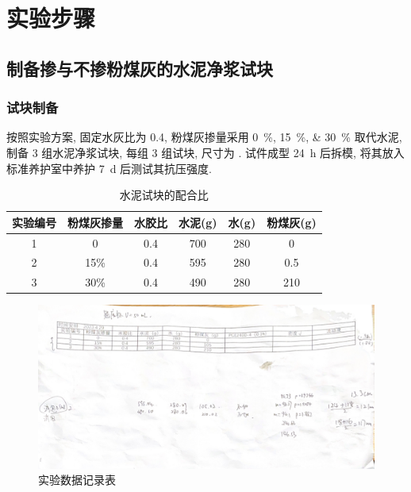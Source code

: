 
\section{实验步骤}

\subsection{制备掺与不掺粉煤灰的水泥净浆试块}

\subsubsection{试块制备}
按照实验方案, 固定水灰比为 \num{0.4}, 粉煤灰掺量采用 \qtylist{0; 15; 30}{\percent} 取代水泥, 制备 3 组水泥净浆试块, 每组 3 组试块, 尺寸为 .
试件成型 \SI{24}{\hour} 后拆模, 将其放入标准养护室中养护 \SI{7}{\day} 后测试其抗压强度.
\begin{table}[!t]
    \centering
    \caption{水泥试块的配合比}
    \begin{tabular}{|c|c|c|c|c|c|}
    \hline
    实验编号 & 粉煤灰掺量 & 水胶比 & 水泥(g) & 水(g) & 粉煤灰(g) \\ \hline
    1    & 0      & 0.4 & 700   & 280  & 0      \\ \hline
    2    & 15\%   & 0.4 & 595   & 280  & 0.5    \\ \hline
    3    & 30\%   & 0.4 & 490   & 280  & 210    \\ \hline
    \end{tabular}
    
\end{table}
\begin{figure}
    \centering
    
    \includegraphics[width = 0.7 \linewidth]{figures/exp1/record table.png}
    \caption{实验数据记录表}
\end{figure}

